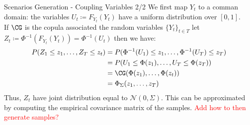 \begin{frame}{Scenarios Generation - Coupling Variables 2/2}
  We first map \(Y_t\) to a comman domain: the  variables \( U_t \coloneqq F_{Y_t}(Y_t) \) have a uniform distribution over \([0,1]\). \\   
  \vspace{0.5cm}
If \(\CG\) is the copula associated the random variables \(\{Y_t\}_{t \in T}\) let  \(Z_t \coloneqq \Phi^{-1}(F_{Y_t}(Y_t)) = \Phi^{-1}(U_t)\) then we have:\\
 \begin{align*}
 P(Z_1 \leq z_1, \ldots, Z_T \leq z_t) &= P(\Phi^{-1}(U_1) \leq z_1, \ldots, \Phi^{-1}(U_T) \leq z_T) \\
 &= P(U_1 \leq \Phi(z_1), \ldots, U_T \leq \Phi(z_T)) \\
 &= \CG(\Phi(z_1), \ldots, \Phi(z_t)) \\
 &= \Phi_{\Sigma}(z_1, \ldots, z_T)
 \end{align*}
 Thus,  \(Z_t\) have joint distribution equal to \(\mathcal{N}(0, \Sigma)\). This can be approximated by computing the empirical covariance matrix of the samples.
 \textcolor{red}{Add how to then generate samples?}
\end{frame} 